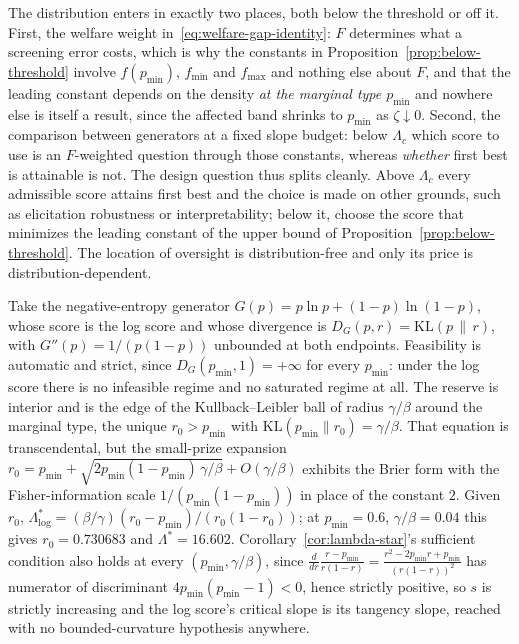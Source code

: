 \documentclass[acmsmall,nonacm,screen]{acmart}
\theoremstyle{acmplain}%
\theoremstyle{acmdefinition}%
\numberwithin{equation}{section}
\begin{document}
The distribution enters in exactly two places, both below the threshold or off it. First, the welfare weight in~\eqref{eq:welfare-gap-identity}: $F$ determines what a screening error costs, which is why the constants in Proposition~\ref{prop:below-threshold} involve $f(p_{\min})$, $f_{\min}$ and $f_{\max}$ and nothing else about $F$, and that the leading constant depends on the density \emph{at the marginal type $p_{\min}$} and nowhere else is itself a result, since the affected band shrinks to $p_{\min}$ as $\zeta \downarrow 0$. Second, the comparison between generators at a fixed slope budget: below $\Lambda_c$ which score to use is an $F$-weighted question through those constants, whereas \emph{whether} first best is attainable is not. The design question thus splits cleanly. Above $\Lambda_c$ every admissible score attains first best and the choice is made on other grounds, such as elicitation robustness or interpretability; below it, choose the score that minimizes the leading constant of the upper bound of Proposition~\ref{prop:below-threshold}. The location of oversight is distribution-free and only its price is distribution-dependent.

\begin{example}\label{ex:log-score}
Take the negative-entropy generator $G(p) = p\ln p + (1-p)\ln(1-p)$, whose score is the log score and whose divergence is $D_G(p,r) = \mathrm{KL}(p\,\|\,r)$, with $G''(p) = 1/(p(1-p))$ unbounded at both endpoints. Feasibility is automatic and strict, since $D_G(p_{\min},1) = +\infty$ for every $p_{\min}$: under the log score there is no infeasible regime and no saturated regime at all. The reserve is interior and is the edge of the Kullback--Leibler ball of radius $\gamma/\beta$ around the marginal type, the unique $r_0 > p_{\min}$ with $\mathrm{KL}(p_{\min}\|r_0) = \gamma/\beta$. That equation is transcendental, but the small-prize expansion $r_0 = p_{\min} + \sqrt{2p_{\min}(1-p_{\min})\,\gamma/\beta} + O(\gamma/\beta)$ exhibits the Brier form with the Fisher-information scale $1/(p_{\min}(1-p_{\min}))$ in place of the constant $2$. Given $r_0$, $\Lambda^*_{\log} = (\beta/\gamma)(r_0-p_{\min})/(r_0(1-r_0))$; at $p_{\min} = 0.6$, $\gamma/\beta = 0.04$ this gives $r_0 = 0.730683$ and $\Lambda^* = 16.602$. Corollary~\ref{cor:lambda-star}'s sufficient condition also holds at every $(p_{\min},\gamma/\beta)$, since $\frac{d}{dr}\frac{r-p_{\min}}{r(1-r)} = \frac{r^2-2p_{\min}r+p_{\min}}{(r(1-r))^2}$ has numerator of discriminant $4p_{\min}(p_{\min}-1) < 0$, hence strictly positive, so $s$ is strictly increasing and the log score's critical slope is its tangency slope, reached with no bounded-curvature hypothesis anywhere.
\end{example}
\end{document}
